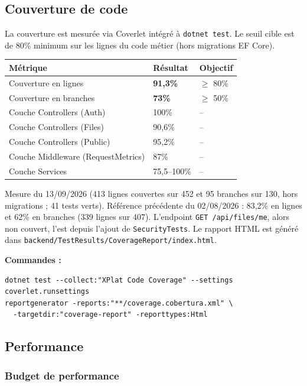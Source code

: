 \documentclass[12pt,a4paper]{article}
\begin{document}
\subsection{Couverture de code}

La couverture est mesur\'ee via Coverlet int\'egr\'e \`a \texttt{dotnet test}. Le seuil cible est de 80\% minimum sur les lignes du code m\'etier (hors migrations EF Core).

\begin{longtable}{p{5cm} p{3cm} p{3cm}}
\toprule
\textbf{M\'etrique} & \textbf{R\'esultat} & \textbf{Objectif} \\
\midrule
\endhead
Couverture en lignes & \textbf{91,3\%} & $\geq$ 80\% \\
Couverture en branches & \textbf{73\%} & $\geq$ 50\% \\
Couche Controllers (Auth) & 100\% & -- \\
Couche Controllers (Files) & 90,6\% & -- \\
Couche Controllers (Public) & 95,2\% & -- \\
Couche Middleware (RequestMetrics) & 87\% & -- \\
Couche Services & 75,5--100\% & -- \\
\bottomrule
\end{longtable}

Mesure du 13/09/2026 (413 lignes couvertes sur 452 et 95 branches sur 130, hors migrations ; 41 tests verts). R\'ef\'erence pr\'ec\'edente du 02/08/2026 : 83,2\% en lignes et 62\% en branches (339 lignes sur 407). L'endpoint \texttt{GET /api/files/me}, alors non couvert, l'est depuis l'ajout de \texttt{SecurityTests}. Le rapport HTML est g\'en\'er\'e dans \texttt{backend/TestResults/CoverageReport/index.html}.

\textbf{Commandes :}
\begin{lstlisting}
dotnet test --collect:"XPlat Code Coverage" --settings coverlet.runsettings
reportgenerator -reports:"**/coverage.cobertura.xml" \
  -targetdir:"coverage-report" -reporttypes:Html
\end{lstlisting}

\subsection{Performance}

\subsubsection{Budget de performance}
\end{document}
